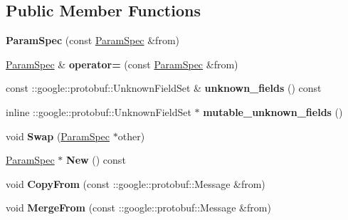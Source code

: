 \subsection*{Public Member Functions}
\begin{DoxyCompactItemize}
\item 
\mbox{\label{classcaffe_1_1_param_spec_a2f858d8555814fa4436d3a055ac0405f}} 
{\bfseries Param\+Spec} (const \mbox{\hyperlink{classcaffe_1_1_param_spec}{Param\+Spec}} \&from)
\item 
\mbox{\label{classcaffe_1_1_param_spec_ac773f770b07847c56e03b32521362834}} 
\mbox{\hyperlink{classcaffe_1_1_param_spec}{Param\+Spec}} \& {\bfseries operator=} (const \mbox{\hyperlink{classcaffe_1_1_param_spec}{Param\+Spec}} \&from)
\item 
\mbox{\label{classcaffe_1_1_param_spec_a792ad9a9903e4be3abdd0531b20346c4}} 
const \+::google\+::protobuf\+::\+Unknown\+Field\+Set \& {\bfseries unknown\+\_\+fields} () const
\item 
\mbox{\label{classcaffe_1_1_param_spec_afc2d824cca1c78e261455545e46a8ff0}} 
inline \+::google\+::protobuf\+::\+Unknown\+Field\+Set $\ast$ {\bfseries mutable\+\_\+unknown\+\_\+fields} ()
\item 
\mbox{\label{classcaffe_1_1_param_spec_a489a8bc81534946e38bbe0057eca729d}} 
void {\bfseries Swap} (\mbox{\hyperlink{classcaffe_1_1_param_spec}{Param\+Spec}} $\ast$other)
\item 
\mbox{\label{classcaffe_1_1_param_spec_a6941852752c11e7b320d5b692100edda}} 
\mbox{\hyperlink{classcaffe_1_1_param_spec}{Param\+Spec}} $\ast$ {\bfseries New} () const
\item 
\mbox{\label{classcaffe_1_1_param_spec_ac4d4e0aee25da0b14a0d41e20ad713df}} 
void {\bfseries Copy\+From} (const \+::google\+::protobuf\+::\+Message \&from)
\item 
\mbox{\label{classcaffe_1_1_param_spec_abf436ef64acc3cfb6d11ae3b37f7fa92}} 
void {\bfseries Merge\+From} (const \+::google\+::protobuf\+::\+Message \&from)

\end{DoxyCompactItemize}
